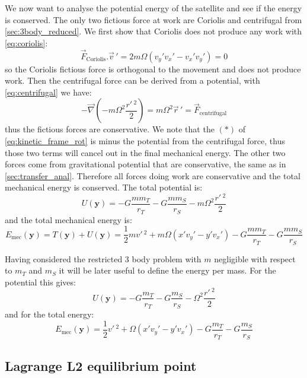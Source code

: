 We now want to analyse the potential energy of the satellite and see if the energy is conserved. The only two fictious force at work are Coriolis and centrifugal from \autoref{sec:3body_reduced}. We first show that Coriolis does not produce any work with \autoref{eq:coriolis}:
\begin{equation}
    \vec{F}_\mathrm{Coriolis}.\vec{v}\,' = 2m\Omega(v_y'v_x' - v_x'v_y') = 0
\end{equation}
so the Coriolis fictious force is orthogonal to the movement and does not produce work. Then the centrifugal force can be derived from a potential, with \autoref{eq:centrifugal} we have:
\begin{equation}
    - \vec{\nabla} (-m\Omega^2 \frac{r'\,^2}{2}) = m \Omega^2 \vec{r}\,' = \vec{F}_\mathrm{centrifugal}
\end{equation}
thus the fictious forces are conservative. We note that the $(\ast)$ of \autoref{eq:kinetic_frame_rot} is minus the potential from the centrifugal force, thus those two terms will cancel out in the final mechanical energy. The other two forces come from gravitational potential that are conservative, the same as in \autoref{sec:transfer_anal}. Therefore all forces doing work are conservative and the total mechanical energy is conserved. The total potential is:
\begin{equation}
    U(\mathbf{y}) = - G \frac{mm_T}{r_T} - G \frac{mm_S}{r_S} - m\Omega^2 \frac{r'\,^2}{2}
\end{equation}
and the total mechanical energy is:
\begin{equation}
    E_\mathrm{mec}(\mathbf{y}) = T(\mathbf{y}) + U(\mathbf{y}) = \frac{1}{2}mv'\,^2 + m\Omega(x'v_y' - y'v_x') - G \frac{mm_T}{r_T} - G \frac{mm_S}{r_S}
\end{equation}

Having considered the restricted 3 body problem with $m$ negligible with respect to $m_T$ and $m_S$ it will be later useful to define the energy per mass. For the potential this gives:
\begin{equation}
    U(\mathbf{y}) = - G \frac{m_T}{r_T} - G \frac{m_S}{r_S} - \Omega^2 \frac{r'\,^2}{2}
    \label{eq:pot_per_mass}
\end{equation}
and for the total energy:
\begin{equation}
    E_\mathrm{mec}(\mathbf{y}) = \frac{1}{2}v'\,^2 + \Omega(x'v_y' - y'v_x') - G \frac{m_T}{r_T} - G \frac{m_S}{r_S}
\end{equation}


\subsection{Lagrange L2 equilibrium point}
\label{sec:lagrange_L2}

